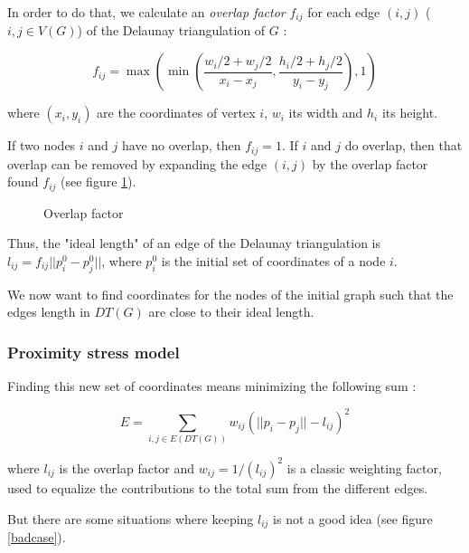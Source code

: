 \documentclass[12pt]{report}
\begin{document}
\bigskip
In order to do that, we calculate an \emph{overlap factor} $f_{ij}$ for each edge $(i,j)$ ($i,j \in V(G)$) of the Delaunay triangulation of $G$ :

\[ f_{ij} = \max \left( \min \left(\frac{w_i/2 + w_j/2}{x_i - x_j}, 
\frac{h_i/2 + h_j/2}{y_i - y_j} \right), 1 \right)\]

where $(x_i,y_i)$ are the coordinates of vertex $i$, $w_i$ its width and $h_i$ its height.

If two nodes $i$ and $j$ have no overlap, then $f_{ij} = 1$. 
If $i$ and $j$ do overlap, then that overlap can be removed by expanding the edge $(i,j)$ by the overlap factor found $f_{ij}$ (see figure \ref{overlapFactor}). 

\begin{figure}[h]
	\center
  \setlength\fboxsep{5pt}
  \setlength\fboxrule{0.5pt}
  \caption{Overlap factor}
  \label{overlapFactor}
\end{figure}

Thus, the "ideal length" of an edge of the Delaunay triangulation is $l_{ij} = f_{ij}||p_i^0 - p_j^0||$, where $p_i^0$ is the initial set of coordinates of a node $i$.

We now want to find coordinates for the nodes of the initial graph such that the edges length in $DT(G)$ are close to their ideal length.

\subsubsection{Proximity stress model}

Finding this new set of coordinates means minimizing the following sum :

\[ E = \sum_{i,j \in E(DT(G))} w_{ij}(||p_i - p_j|| - l_{ij})^2\]

where $l_{ij}$ is the overlap factor and $w_{ij} = 1/(l_{ij})^2$ is a classic weighting factor, used to equalize the contributions to the total sum from the different edges.


But there are some situations where keeping $l_{ij}$ is not a good idea (see figure \ref{badcase}).
\end{document}
